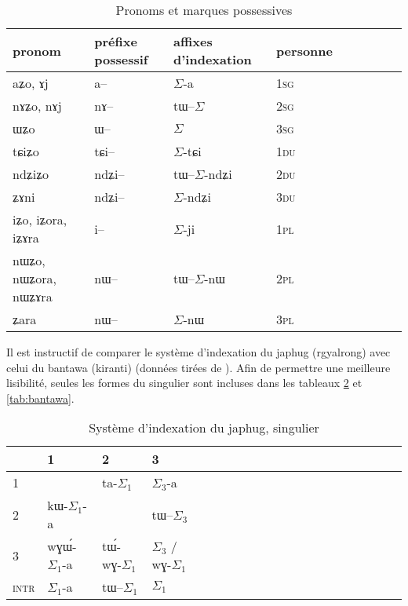 \documentclass[oldfontcommands,oneside,a4paper,11pt]{article}
\newcommand{\ipa}[1]{{\phon \mbox{#1}}} %
\newcommand{\grise}[1]{\cellcolor{lightgray}\textbf{#1}}
\newcommand{\ra}{$\Sigma_1$}
\newcommand{\rc}{$\Sigma_3$}
\newcommand{\ro}{$\Sigma$}
\begin{document}
\begin{table}[H] \centering
\caption{Pronoms et marques possessives }\label{tab:pronoms}
\begin{tabular}{lllllllll} 
\toprule
pronom & préfixe possessif & affixes d'indexation& personne \\
\midrule
 \ipa{aʑo},    \ipa{ɤj} &	\ipa{a--}  &	\ro{}-\ipa{a}	& 1\textsc{sg} \\
\ipa{nɤʑo},  \ipa{nɤj} &	\ipa{nɤ--}  &	\ipa{tɯ--}\ro{} &		2\textsc{sg}\\
\ipa{ɯʑo}  &	\ipa{ɯ--}  &	\ro{} 	&	3\textsc{sg}\\
\midrule
\ipa{tɕiʑo}  &	\ipa{tɕi--}  &			\ro{}-\ipa{tɕi}	&	1\textsc{du} \\
\ipa{ndʑiʑo}  &	\ipa{ndʑi--}  &		\ipa{tɯ--}\ro{}-\ipa{ndʑi} &		2\textsc{du} \\	
\ipa{ʑɤni}  &	\ipa{ndʑi--}  &	\ro{}-\ipa{ndʑi} &		3\textsc{du} \\	
\midrule
\ipa{iʑo}, \ipa{iʑora},   \ipa{iʑɤra}   &	\ipa{i--}  &	\ro{}-\ipa{ji}	&		1\textsc{pl} \\
\ipa{nɯʑo}, \ipa{nɯʑora},   \ipa{nɯʑɤra}  &	\ipa{nɯ--}  &	\ipa{tɯ--}\ro{}-\ipa{nɯ} &			2\textsc{pl} \\
\ipa{ʑara}  &	\ipa{nɯ--}  &			\ro{}-\ipa{nɯ} &3\textsc{pl} \\
\bottomrule
\end{tabular}
\end{table}


 

Il est instructif de comparer le système d'indexation du japhug (rgyalrong) avec celui du bantawa (kiranti) (données tirées de \citealt{jacques10inverse, doornenbal09}). Afin de permettre une meilleure lisibilité, seules les formes du singulier sont incluses dans les tableaux \ref{tab:japhug} et \ref{tab:bantawa}.

 

\begin{table}[H]
\caption{Système d'indexation du japhug, singulier} \centering \label{tab:japhug}
\begin{tabular}{l|lllllllllllllllllll}
\toprule
&1 & 2 &3 &\\
\midrule
1 &\grise{}&\ipa{ta}-\ra{} & \rc{}-\ipa{a}	 \\
2 &\ipa{kɯ}-\ra{}-\ipa{a}	 &\grise{} &\ipa{tɯ--}\rc{} \\
3 &\ipa{wɣɯ́-}\ra{}-\ipa{a}&\ipa{tɯ́-wɣ-}\ra{}& \rc{} / \ipa{wɣ}-\ra{}\\
\midrule
\textsc{intr} & \ra{}-\ipa{a}&\ipa{tɯ--}\ra{}&\ra{} \\
\bottomrule
\end{tabular}
\end{table}
\end{document}
